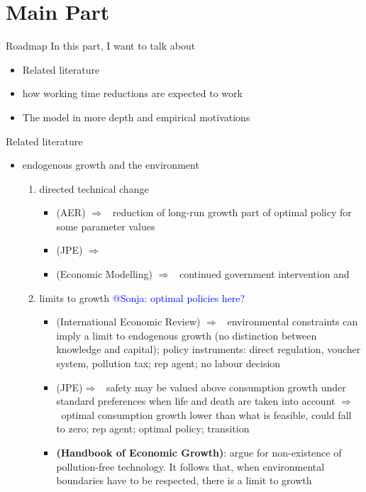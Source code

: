 \documentclass[11pt,aspectratio=169]{beamer}
\newcommand{\tr}[1]{\textcolor{blue}{#1}}
\newcommand{\ar}{$\Rightarrow$ \ }
\begin{document}
\section{Main Part}
\begin{frame}{Roadmap}
In this part, I want to talk about
\begin{itemize}
\item Related literature
\item how working time reductions are expected to work
\item The model in more depth and empirical motivations
\end{itemize}
\end{frame}

\begin{frame}[allowframebreaks]{Related literature}
\begin{itemize}
\item endogenous growth and the environment
\begin{enumerate}
\item  directed technical change
\begin{itemize}
	\item \cite{Acemoglu2012TheChange}(AER) \ar reduction of long-run growth part of optimal policy for some parameter values
	\item \cite{Acemoglu2016TransitionTechnology}(JPE) \ar 
	\item \cite{Eriksson2018PhasingChange}(Economic Modelling) \ar continued government intervention and 
\end{itemize}
\item  limits to growth \tr{@Sonja: optimal policies here?}
\begin{itemize}
	\item \cite{Stokey1998AreGrowth}(International Economic Review) \ar environmental constraints can imply a limit to endogenous growth (no distinction between knowledge and capital); policy instruments: direct regulation, voucher system, pollution tax; rep agent; no labour decision 
	\item \cite{Jones2016LifeGrowth}(JPE)\ar safety may be valued above consumption growth under standard preferences when life and death are taken into account \ar optimal consumption growth lower than what is feasible, could fall to zero; rep agent; optimal policy; transition
	\item \textbf{\cite{Brock2005ChapterEmpirics} (Handbook of Economic Growth)}: argue for non-existence of pollution-free technology. It follows that, when environmental boundaries have to be respected, there is a limit to growth

\end{itemize}
\end{enumerate}
\end{itemize}
\end{frame}
\end{document}
